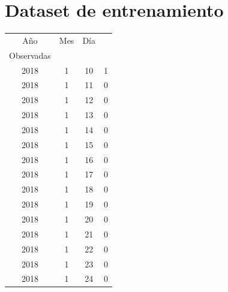 
\appendix
\chapter{Dataset de entrenamiento}
\begin{longtable} {|c|c|c|c|}
\hline
Año                      & Mes                                                                                                                                                                                                   & Día                                                 &
 \begin{tabular}[c]{@{}c@{}}Ventas\\ Observadas\end{tabular} \\     \hline
2018         & 1            & 10           & 1                         \\ 
\hline
2018         & 1            & 11           & 0                         \\ 
\hline
2018         & 1            & 12           & 0                         \\ 
\hline
2018         & 1            & 13           & 0                         \\ 
\hline
2018         & 1            & 14           & 0                         \\ 
\hline
2018         & 1            & 15           & 0                         \\ 
\hline
2018         & 1            & 16           & 0                         \\ 
\hline
2018         & 1            & 17           & 0                         \\ 
\hline
2018         & 1            & 18           & 0                         \\ 
\hline
2018         & 1            & 19           & 0                         \\ 
\hline
2018         & 1            & 20           & 0                         \\ 
\hline
2018         & 1            & 21           & 0                         \\ 
\hline
2018         & 1            & 22           & 0                         \\ 
\hline
2018         & 1            & 23           & 0                         \\ 
\hline
2018         & 1            & 24           & 0                         \\ 

\end{longtable}
